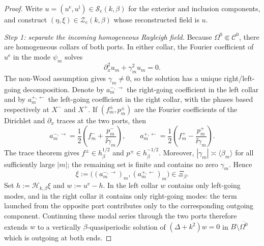 \begin{proof}
Write $u=(u^{\mathrm e},u^{\mathrm i})\in
\mathcal S_{\mathrm c}(k,\beta)$ for the exterior and inclusion components,
and construct $(\eta,\xi)\in\mathcal Z_{\mathrm c}(k,\beta)$ whose
reconstructed field is $u$.

\emph{Step 1: separate the incoming homogeneous Rayleigh field.}
Because $\Omega^0\Subset\mathcal C^0$, there are homogeneous collars of both
ports.  In either collar, the Fourier coefficient of $u^{\mathrm e}$ in the
mode $\psi_m$ solves
\[
  \partial_x^2u_m+\gamma_m^2u_m=0.
\]
The non-Wood assumption gives $\gamma_m\neq0$, so the solution has a unique
right/left-going decomposition.  Denote by $a_m^{-,\rightarrow}$ the
right-going coefficient in the left collar and by
$a_m^{+,\leftarrow}$ the left-going coefficient in the right collar, with
the phases based respectively at $X^-$ and $X^+$.  If $(f_m^\pm,p_m^\pm)$
are the Fourier coefficients of the Dirichlet and $\partial_x$ traces at the
two ports, then
\[
  a_m^{-,\rightarrow}
  =\frac12\left(f_m^-+\frac{p_m^-}{\ii\gamma_m}\right),
  \qquad
  a_m^{+,\leftarrow}
  =\frac12\left(f_m^+-\frac{p_m^+}{\ii\gamma_m}\right).
\]
The trace theorem gives $f^\pm\in h^{1/2}_\beta$ and
$p^\pm\in h^{-1/2}_\beta$.  Moreover,
$|\gamma_m|\asymp\langle\beta_m\rangle$ for all sufficiently large $|m|$;
the remaining set is finite and contains no zero $\gamma_m$.  Hence
\[
  \xi:=\bigl((a_m^{-,\rightarrow})_m,
             (a_m^{+,\leftarrow})_m\bigr)\in\Xi_\beta.
\]
Set $h:=\mathcal H_{k,\beta}\xi$ and $w:=u^{\mathrm e}-h$.  In the left
collar $w$ contains only left-going modes, and in the right collar it contains
only right-going modes: the term launched from the opposite port contributes
only to the corresponding outgoing component.  Continuing these modal
series through the two ports therefore extends $w$ to a vertically
$\beta$-quasiperiodic solution of $(\Delta+k^2)w=0$ in
$B\setminus\overline{\Omega^0}$ which is outgoing at both ends.


\end{proof}

